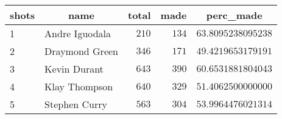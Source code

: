 \begin{table}[!tbp]
\begin{center}
\begin{tabular}{llrrr}
\hline\hline
\multicolumn{1}{l}{shots}&\multicolumn{1}{c}{name}&\multicolumn{1}{c}{total}&\multicolumn{1}{c}{made}&\multicolumn{1}{c}{perc_made}\tabularnewline
\hline
1&Andre Iguodala&$210$&$134$&$63.8095238095238$\tabularnewline
2&Draymond Green&$346$&$171$&$49.4219653179191$\tabularnewline
3&Kevin Durant&$643$&$390$&$60.6531881804043$\tabularnewline
4&Klay Thompson&$640$&$329$&$51.4062500000000$\tabularnewline
5&Stephen Curry&$563$&$304$&$53.9964476021314$\tabularnewline
\hline
\end{tabular}\end{center}
\end{table}
